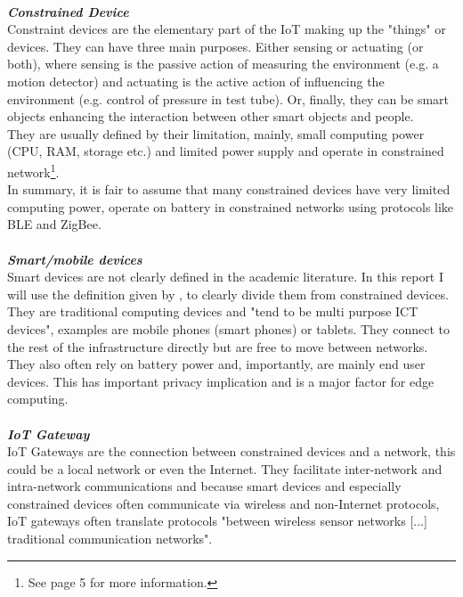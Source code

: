 \vspace{0.5mm} \ \\
\textbf{\textit{Constrained Device}}\\
Constraint devices are the elementary part of the IoT 
making up the "things" or devices\cite{contstraintDevicesTerminology}.
They can have three main purposes.
Either sensing or actuating (or both), where sensing is the 
passive action of measuring the environment (e.g. a motion detector) and actuating is the active action of influencing the environment (e.g. control of pressure in test tube). Or, finally, they can be smart objects enhancing the interaction between other smart objects and people.\\
They are usually defined by their limitation, mainly, small computing power (CPU, RAM, storage etc.) and limited power supply and operate in constrained network\footnote{See \cite{contstraintDevicesTerminology} page 5 for more information.}.\\
In summary, it is fair to assume that many constrained devices have very limited computing power, operate on battery in constrained networks using protocols like BLE and ZigBee. \\
\vspace{0.5mm} \ \\
\textbf{\textit{Smart/mobile devices}}\\
Smart devices are not clearly defined in the academic literature. In this report I will use the definition given by \citeauthor{poslad2011smartDevices}\cite{poslad2011smartDevices}, to clearly divide them from constrained devices. They are traditional computing devices and "tend to be multi purpose ICT devices"\cite{poslad2011smartDevices}, examples are mobile phones (smart phones) or tablets. They connect to the rest of the infrastructure directly but are free to move between networks. They also often rely on battery power and, importantly, are mainly end user devices. This has important privacy implication and is a major factor for edge computing.\\
\vspace{0.5mm} \ \\
\textbf{\textit{IoT Gateway}}\\
IoT Gateways are the connection between constrained devices and a network, this could be a local network or even the Internet. They facilitate inter-network and intra-network communications and because smart devices and especially constrained devices often communicate via wireless and non-Internet protocols, IoT gateways often translate protocols "between wireless sensor networks [...] traditional communication networks"\cite{zhu2010iotGatewayDefinition}.
